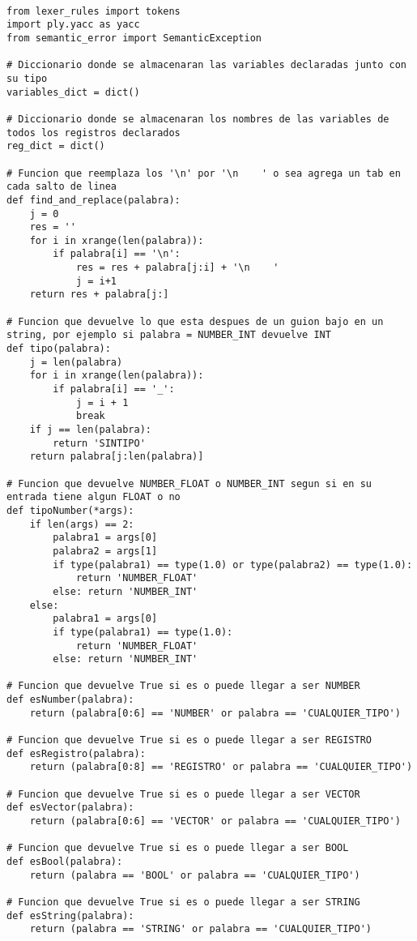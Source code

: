 \begin{verbatim}

from lexer_rules import tokens
import ply.yacc as yacc
from semantic_error import SemanticException

# Diccionario donde se almacenaran las variables declaradas junto con su tipo
variables_dict = dict()

# Diccionario donde se almacenaran los nombres de las variables de todos los registros declarados
reg_dict = dict()

# Funcion que reemplaza los '\n' por '\n    ' o sea agrega un tab en cada salto de linea
def find_and_replace(palabra):
    j = 0
    res = ''
    for i in xrange(len(palabra)):
        if palabra[i] == '\n':
            res = res + palabra[j:i] + '\n    '
            j = i+1
    return res + palabra[j:]

# Funcion que devuelve lo que esta despues de un guion bajo en un string, por ejemplo si palabra = NUMBER_INT devuelve INT
def tipo(palabra):
	j = len(palabra)
	for i in xrange(len(palabra)):
		if palabra[i] == '_':
			j = i + 1
			break
	if j == len(palabra):
		return 'SINTIPO'
	return palabra[j:len(palabra)]

# Funcion que devuelve NUMBER_FLOAT o NUMBER_INT segun si en su entrada tiene algun FLOAT o no
def tipoNumber(*args):
	if len(args) == 2:
		palabra1 = args[0]
		palabra2 = args[1]
		if type(palabra1) == type(1.0) or type(palabra2) == type(1.0):
			return 'NUMBER_FLOAT'
		else: return 'NUMBER_INT'
	else: 
		palabra1 = args[0]
		if type(palabra1) == type(1.0):
			return 'NUMBER_FLOAT'
		else: return 'NUMBER_INT'

# Funcion que devuelve True si es o puede llegar a ser NUMBER
def esNumber(palabra):
	return (palabra[0:6] == 'NUMBER' or palabra == 'CUALQUIER_TIPO') 

# Funcion que devuelve True si es o puede llegar a ser REGISTRO
def esRegistro(palabra):
	return (palabra[0:8] == 'REGISTRO' or palabra == 'CUALQUIER_TIPO')

# Funcion que devuelve True si es o puede llegar a ser VECTOR
def esVector(palabra):
    return (palabra[0:6] == 'VECTOR' or palabra == 'CUALQUIER_TIPO') 

# Funcion que devuelve True si es o puede llegar a ser BOOL
def esBool(palabra):
    return (palabra == 'BOOL' or palabra == 'CUALQUIER_TIPO') 

# Funcion que devuelve True si es o puede llegar a ser STRING
def esString(palabra):
    return (palabra == 'STRING' or palabra == 'CUALQUIER_TIPO') 


\end{verbatim}
